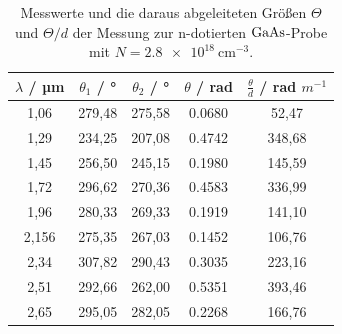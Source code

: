 \begin{table}[h]
  \centering
  \caption{Messwerte und die daraus abgeleiteten Größen $\Theta$ und $\Theta/d$ der Messung zur n-dotierten $\ce{GaAs}$-Probe mit $N=\SI{2,8e18}{\centi\meter^{-3}}$.}
  \label{tab:probe2}
  \begin{tabular}{S[table-format=1.1] S S S S}
    {$\lambda$ / µm} & {$\theta_1$ / °} & {$\theta_2$ / °} & {$\theta$ / rad} & {$\frac{\theta}{d}$ / rad $m^{-1}$}\\
    ,06 &  279,48 &  275,58 & 0.0680 & 52,47\\
    1,29 &  234,25 &  207,08 & 0.4742 & 348,68\\
    1,45 &  256,50 &  245,15 & 0.1980 & 145,59\\
    1,72 &  296,62 &  270,36 & 0.4583 & 336,99\\
    1,96 &  280,33 &  269,33 & 0.1919 & 141,10\\
    2,156 & 275,35 &  267,03 & 0.1452 & 106,76\\
    2,34 & 307,82 &  290,43 & 0.3035 & 223,16\\
    2,51 & 292,66 &  262,00 & 0.5351 & 393,46\\
    2,65 & 295,05 &  282,05 & 0.2268 & 166,76\\
  \end{tabular}
\end{table}

